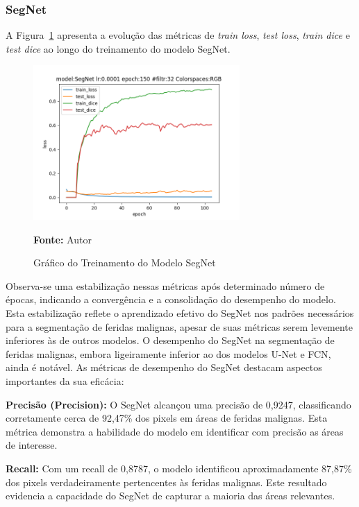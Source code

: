 \subsubsection{SegNet}

A Figura~\ref{fig:graphSegNet} apresenta a evolução das métricas de \textit{train loss}, \textit{test loss}, \textit{train dice} e \textit{test dice} ao longo do treinamento do modelo \ac{SegNet}. 

\begin{figure}[htbp]
    \centering
    \caption{Gráfico do Treinamento do Modelo \acf{SegNet}}
    \includegraphics[width=0.7\textwidth]{img/segnetprunedmodelfile.png}
    \label{fig:graphSegNet}
    \par\medskip\textbf{Fonte:} Autor
\end{figure}

Observa-se uma estabilização nessas métricas após determinado número de épocas, indicando a convergência e a consolidação do desempenho do modelo. Esta estabilização reflete o aprendizado efetivo do \ac{SegNet} nos padrões necessários para a segmentação de feridas malignas, apesar de suas métricas serem levemente inferiores às de outros modelos. O desempenho do \ac{SegNet} na segmentação de feridas malignas, embora ligeiramente inferior ao dos modelos \ac{U-Net} e \ac{FCN}, ainda é notável. As métricas de desempenho do \ac{SegNet} destacam aspectos importantes da sua eficácia:

\textbf{Precisão (Precision):} O \ac{SegNet} alcançou uma precisão de 0,9247, classificando corretamente cerca de 92,47\% dos pixels em áreas de feridas malignas. Esta métrica demonstra a habilidade do modelo em identificar com precisão as áreas de interesse.

\textbf{Recall:} Com um recall de 0,8787, o modelo identificou aproximadamente 87,87\% dos pixels verdadeiramente pertencentes às feridas malignas. Este resultado evidencia a capacidade do \ac{SegNet} de capturar a maioria das áreas relevantes.

